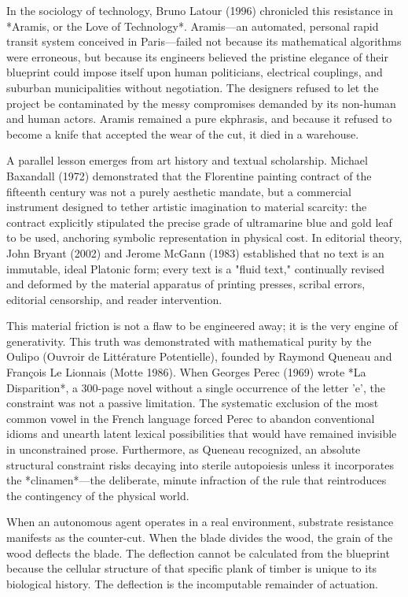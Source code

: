 \documentclass[11pt,twocolumn]{article}
\begin{document}
In the sociology of technology, Bruno Latour (1996) chronicled this resistance in *Aramis, or the Love of Technology*. Aramis—an automated, personal rapid transit system conceived in Paris—failed not because its mathematical algorithms were erroneous, but because its engineers believed the pristine elegance of their blueprint could impose itself upon human politicians, electrical couplings, and suburban municipalities without negotiation. The designers refused to let the project be contaminated by the messy compromises demanded by its non-human and human actors. Aramis remained a pure ekphrasis, and because it refused to become a knife that accepted the wear of the cut, it died in a warehouse.

A parallel lesson emerges from art history and textual scholarship. Michael Baxandall (1972) demonstrated that the Florentine painting contract of the fifteenth century was not a purely aesthetic mandate, but a commercial instrument designed to tether artistic imagination to material scarcity: the contract explicitly stipulated the precise grade of ultramarine blue and gold leaf to be used, anchoring symbolic representation in physical cost. In editorial theory, John Bryant (2002) and Jerome McGann (1983) established that no text is an immutable, ideal Platonic form; every text is a "fluid text," continually revised and deformed by the material apparatus of printing presses, scribal errors, editorial censorship, and reader intervention.

This material friction is not a flaw to be engineered away; it is the very engine of generativity. This truth was demonstrated with mathematical purity by the Oulipo (Ouvroir de Littérature Potentielle), founded by Raymond Queneau and François Le Lionnais (Motte 1986). When Georges Perec (1969) wrote *La Disparition*, a 300-page novel without a single occurrence of the letter 'e', the constraint was not a passive limitation. The systematic exclusion of the most common vowel in the French language forced Perec to abandon conventional idioms and unearth latent lexical possibilities that would have remained invisible in unconstrained prose. Furthermore, as Queneau recognized, an absolute structural constraint risks decaying into sterile autopoiesis unless it incorporates the *clinamen*—the deliberate, minute infraction of the rule that reintroduces the contingency of the physical world.

When an autonomous agent operates in a real environment, substrate resistance manifests as the counter-cut. When the blade divides the wood, the grain of the wood deflects the blade. The deflection cannot be calculated from the blueprint because the cellular structure of that specific plank of timber is unique to its biological history. The deflection is the incomputable remainder of actuation.
\end{document}
